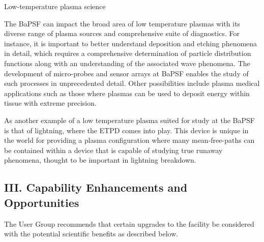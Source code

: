 \documentclass[11pt]{article}
\begin{document}
Low-temperature plasma science

The BaPSF can impact the broad area of low temperature plasmas with its diverse range
of plasma sources and comprehensive suite of diagnostics. For instance, it is important
to better understand deposition and etching phenomena in detail, which requires a
comprehensive determination of particle distribution functions along with an
understanding of the associated wave phenomena. The development of micro-probes
and sensor arrays at BaPSF enables the study of such processes in unprecedented detail.
Other possibilities include plasma medical applications such as those where plasmas can
be used to deposit energy within tissue with extreme precision.

As another example of a low temperature plasma suited for study at the BaPSF is that of
lightning, where the ETPD comes into play. This device is unique in the world for
providing a plasma configuration where many mean-free-paths can be contained within
a device that is capable of studying true runaway phenomena, thought to be important in
lightning breakdown.

\subsection{III. Capability Enhancements and Opportunities}

The User Group recommends that certain upgrades to the facility be considered with the
potential scientific benefits as described below.
\end{document}
